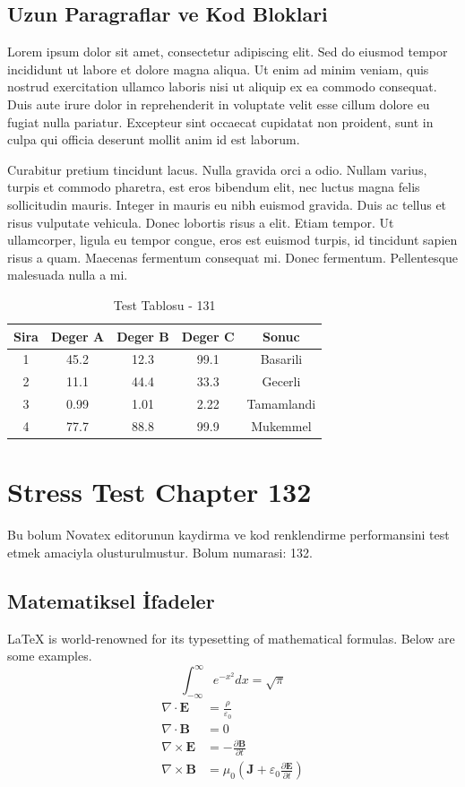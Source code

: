 \documentclass[12pt,a4paper]{article}
\begin{document}
\subsection{Uzun Paragraflar ve Kod Bloklari}
Lorem ipsum dolor sit amet, consectetur adipiscing elit. Sed do eiusmod tempor incididunt ut labore et dolore magna aliqua. Ut enim ad minim veniam, quis nostrud exercitation ullamco laboris nisi ut aliquip ex ea commodo consequat. Duis aute irure dolor in reprehenderit in voluptate velit esse cillum dolore eu fugiat nulla pariatur. Excepteur sint occaecat cupidatat non proident, sunt in culpa qui officia deserunt mollit anim id est laborum.

Curabitur pretium tincidunt lacus. Nulla gravida orci a odio. Nullam varius, turpis et commodo pharetra, est eros bibendum elit, nec luctus magna felis sollicitudin mauris. Integer in mauris eu nibh euismod gravida. Duis ac tellus et risus vulputate vehicula. Donec lobortis risus a elit. Etiam tempor. Ut ullamcorper, ligula eu tempor congue, eros est euismod turpis, id tincidunt sapien risus a quam. Maecenas fermentum consequat mi. Donec fermentum. Pellentesque malesuada nulla a mi.

\begin{table}[h!]
\centering
\begin{tabular}{|c|c|c|c|c|}
\hline
\textbf{Sira} & \textbf{Deger A} & \textbf{Deger B} & \textbf{Deger C} & \textbf{Sonuc} \\
\hline
1 & 45.2 & 12.3 & 99.1 & Basarili \\
2 & 11.1 & 44.4 & 33.3 & Gecerli \\
3 & 0.99 & 1.01 & 2.22 & Tamamlandi \\
4 & 77.7 & 88.8 & 99.9 & Mukemmel \\
\hline
\end{tabular}
\caption{Test Tablosu - 131}
\end{table}

\newpage
\section{Stress Test Chapter 132}
Bu bolum Novatex editorunun kaydirma ve kod renklendirme performansini test etmek amaciyla olusturulmustur. Bolum numarasi: 132.

\subsection{Matematiksel İfadeler}
\LaTeX{} is world-renowned for its typesetting of mathematical formulas. Below are some examples.
\begin{equation}
\int_{-\infty}^{\infty} e^{-x^2} dx = \sqrt{\pi}
\end{equation}
\begin{align}
\nabla \cdot \mathbf{E} &= \frac{\rho}{\varepsilon_0} \\
\nabla \cdot \mathbf{B} &= 0 \\
\nabla \times \mathbf{E} &= -\frac{\partial \mathbf{B}}{\partial t} \\
\nabla \times \mathbf{B} &= \mu_0\left(\mathbf{J} + \varepsilon_0 \frac{\partial \mathbf{E}}{\partial t}\right)
\end{align}
\end{document}
